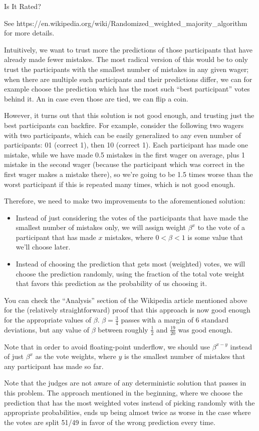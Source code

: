 \begin{tutorial}{Is It Rated?}

See https://en.wikipedia.org/wiki/Randomized\_weighted\_majority\_algorithm for more details.

Intuitively, we want to trust more the predictions of those participants that have already made fewer mistakes. The most radical version of this would be to only trust the participants with the smallest number of mistakes in any given wager; when there are multiple such participants and their predictions differ, we can for example choose the prediction which has the most such ``best participant'' votes behind it. An in case even those are tied, we can flip a coin.

However, it turns out that this solution is not good enough, and trusting just the best participants can backfire. For example, consider the following two wagers with two participants, which can be easily generalized to any even number of participants: 01 (correct 1), then 10 (correct 1). Each participant has made one mistake, while we have made 0.5 mistakes in the first wager on average, plus 1 mistake in the second wager (because the participant which was correct in the first wager makes a mistake there), so we're going to be 1.5 times worse than the worst participant if this is repeated many times, which is not good enough.

Therefore, we need to make two improvements to the aforementioned solution:
\begin{itemize}
\item Instead of just considering the votes of the participants that have made the smallest number of mistakes only, we will assign weight $\beta^x$ to the vote of a participant that has made $x$ mistakes, where $0 < \beta < 1$ is some value that we'll choose later.
\item Instead of choosing the prediction that gets most (weighted) votes, we will choose the prediction randomly, using the fraction of the total vote weight that favors this prediction as the probability of us choosing it.
\end{itemize}

You can check the ``Analysis'' section of the Wikipedia article mentioned above for the (relatively straightforward) proof
that this approach is now good enough for the appropriate values of $\beta$. $\beta=\frac{3}{4}$ passes with a margin of 6 standard deviations, but any value of $\beta$ between roughly $\frac{1}{2}$ and $\frac{19}{20}$ was good enough.

Note that in order to avoid floating-point underflow, we should use $\beta^{x-y}$ instead of just $\beta^x$ as the vote weights, where $y$ is the smallest number of mistakes that any participant has made so far.

Note that the judges are not aware of any deterministic solution that passes in this problem. The approach mentioned
in the beginning, where we choose the prediction that has the most weighted votes instead of picking randomly
with the appropriate probabilities, ends up being almost twice as worse in the case where the votes are split 51/49 in favor
of the wrong prediction every time.

\end{tutorial}
